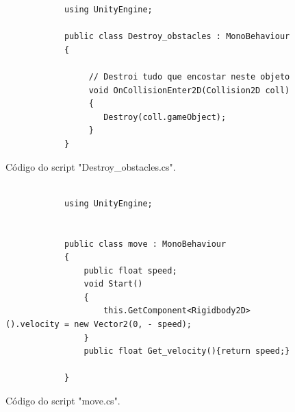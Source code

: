     \begin{figure}[ht!]
        \centering
        \begin{lstlisting}
            using UnityEngine;

            public class Destroy_obstacles : MonoBehaviour
            {
                
                 // Destroi tudo que encostar neste objeto
                 void OnCollisionEnter2D(Collision2D coll) 
                 {
                    Destroy(coll.gameObject);
                 }
            }
        \end{lstlisting}
        \caption{Código do script "Destroy\_obstacles.cs".}
        \label{code:destruction_code}

    \end{figure}


    \begin{figure}[ht!]
        \centering
        \begin{lstlisting}
            
            using UnityEngine;


            public class move : MonoBehaviour
            {
                public float speed;
                void Start()
                {
                    this.GetComponent<Rigidbody2D>().velocity = new Vector2(0, - speed);
                }
                public float Get_velocity(){return speed;}
                
            }

        \end{lstlisting}
        \caption{Código do script "move.cs".}
        \label{code:move}

    \end{figure}


